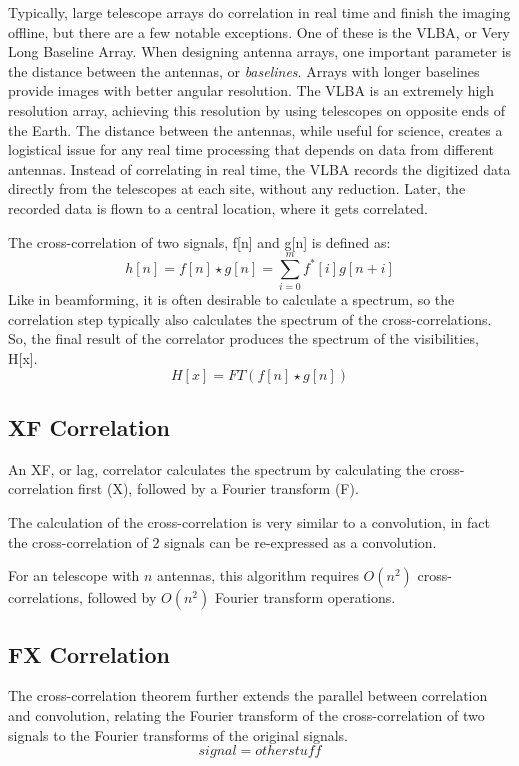 Typically, large telescope arrays do correlation in real time and finish the imaging offline, but there are a few notable exceptions.
One of these is the VLBA, or Very Long Baseline Array. 
When designing antenna arrays, one important parameter is the distance between the antennas, or \emph{baselines}. 
Arrays with longer baselines provide images with better angular resolution. 
The VLBA is an extremely high resolution array, achieving this resolution by using telescopes on opposite ends of the Earth. 
The distance between the antennas, while useful for science, creates a logistical issue for any real time processing that depends on data from different antennas. 
Instead of correlating in real time, the VLBA records the digitized data directly from the telescopes at each site, without any reduction.
Later, the recorded data is flown to a central location, where it gets correlated.

The cross-correlation of two signals, f[n] and g[n] is defined as:
\[h[n] = f[n]\star g[n] = \sum_{i=0}^m f^*[i]g[n+i]\]
Like in beamforming, it is often desirable to calculate a spectrum, so the correlation step typically also calculates the spectrum of the cross-correlations. 
So, the final result of the correlator produces the spectrum of the visibilities, H[x].
\[H[x] = FT(f[n]\star g[n])\]


\subsection{XF Correlation}
An XF, or lag, correlator calculates the spectrum by calculating the cross-correlation first (X), followed by a Fourier transform (F).

The calculation of the cross-correlation is very similar to a convolution, in fact the cross-correlation of 2 signals can be re-expressed as a convolution. 
\[\]
\[\]

For an telescope with $n$ antennas, this algorithm requires $O(n^2)$ cross-correlations, followed by $O(n^2)$ Fourier transform operations.
 


\subsection{FX Correlation}
\cite{Bunton:2000tz}

The cross-correlation theorem further extends the parallel between correlation and convolution, relating the Fourier transform of the cross-correlation of two signals to the Fourier transforms of the original signals. 
\[ signal = other stuff\]

